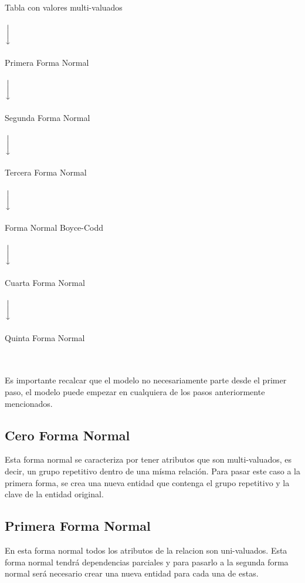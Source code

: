 \documentclass[12pt]{article}
\begin{document}
\begin{center}
	Tabla con valores multi-valuados \\\\
	$\bigg\downarrow$ \\\\
	Primera Forma Normal \\\\
	$\bigg\downarrow$  \\\\ 
	Segunda Forma Normal \\\\
	$\bigg\downarrow$  \\\\
	Tercera Forma Normal \\\\
	$\bigg\downarrow$  \\\\
	Forma Normal Boyce-Codd \\\\
	$\bigg\downarrow$  \\\\
	Cuarta Forma Normal \\\\
	$\bigg\downarrow$  \\\\
	Quinta Forma Normal
\end{center}
\\\\
Es importante recalcar que el modelo no necesariamente parte desde el primer paso, el modelo
puede empezar en cualquiera de los pasos anteriormente mencionados.

\newpage

\subsection{Cero Forma Normal}
Esta forma normal se caracteriza por tener atributos que son multi-valuados, es decir, un
grupo repetitivo dentro de una mísma relación. Para pasar este caso a la primera forma, se 
crea una nueva entidad que contenga el grupo repetitivo y la clave de la entidad original.

\subsection{Primera Forma Normal}
En esta forma normal todos los atributos de la relacion son uni-valuados. Esta forma normal
tendrá dependencias parciales y para pasarlo a la segunda forma normal será necesario crear
una nueva entidad para cada una de estas.
\end{document}
